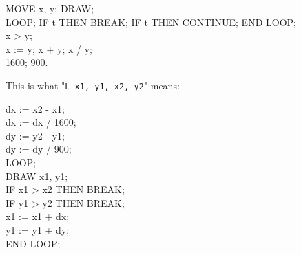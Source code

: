 \documentclass{article}
\begin{document}
{\ttfamily MOVE x, y; DRAW; \\
LOOP; IF t THEN BREAK; IF t THEN CONTINUE; END LOOP; \\
x > y; \\
x := y; x + y; x / y; \\
1600; 900.}

\plush{}

This is what "\texttt{L x1, y1, x2, y2}" means:

\begin{multicols}{2}
{\ttfamily
dx := x2 - x1;\\
dx := dx / 1600;\\
dy := y2 - y1;\\
dy := dy / 900;\\
LOOP;\\
DRAW x1, y1;\\
IF x1 > x2 THEN BREAK;\\
IF y1 > y2 THEN BREAK;\\
x1 := x1 + dx;\\
y1 := y1 + dy;\\
END LOOP;}
\par\columnbreak\par
{}
\end{multicols}
\end{document}
